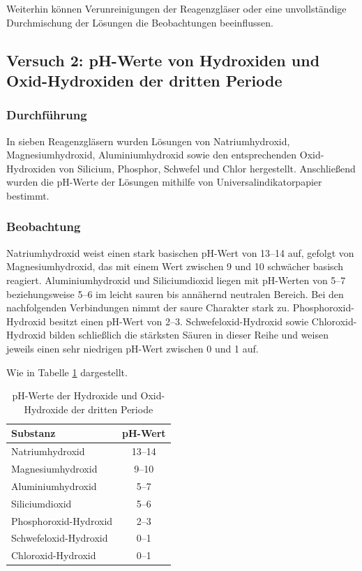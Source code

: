 Weiterhin können Verunreinigungen der Reagenzgläser oder eine unvollständige Durchmischung der Lösungen die Beobachtungen beeinflussen.

\subsection{Versuch 2: pH-Werte von Hydroxiden und Oxid-Hydroxiden der dritten Periode}

\subsubsection{Durchführung}
In sieben Reagenzgläsern wurden Lösungen von Natriumhydroxid, Magnesiumhydroxid, Aluminiumhydroxid sowie den entsprechenden Oxid-Hydroxiden von Silicium, Phosphor, Schwefel und Chlor hergestellt. Anschließend wurden die pH-Werte der Lösungen mithilfe von Universalindikatorpapier bestimmt.

\subsubsection{Beobachtung}
Natriumhydroxid weist einen stark basischen pH-Wert von 13--14 auf, gefolgt von Magnesiumhydroxid, das mit einem Wert zwischen 9 und 10 schwächer basisch reagiert. Aluminiumhydroxid und Siliciumdioxid liegen mit pH-Werten von 5--7 beziehungsweise 5--6 im leicht sauren bis annähernd neutralen Bereich. Bei den nachfolgenden Verbindungen nimmt der saure Charakter stark zu. Phosphoroxid-Hydroxid besitzt einen pH-Wert von 2--3. Schwefeloxid-Hydroxid  sowie Chloroxid-Hydroxid bilden schließlich die stärksten Säuren in dieser Reihe und weisen jeweils einen sehr niedrigen pH-Wert zwischen 0 und 1 auf.

Wie in Tabelle \ref{tab:ph_3_periode} dargestellt.

\begin{table}[H]
    \centering
    \caption{pH-Werte der Hydroxide und Oxid-Hydroxide der dritten Periode}
    \label{tab:ph_3_periode}
    \begin{tabular}{|l|c|}
        \hline
        \textbf{Substanz}     & \textbf{pH-Wert} \\
        \hline
        Natriumhydroxid       & 13--14           \\
        Magnesiumhydroxid     & 9--10            \\
        Aluminiumhydroxid     & 5--7             \\
        Siliciumdioxid        & 5--6             \\
        Phosphoroxid-Hydroxid & 2--3             \\
        Schwefeloxid-Hydroxid & 0--1             \\
        Chloroxid-Hydroxid    & 0--1             \\
        \hline
    \end{tabular}
\end{table}


